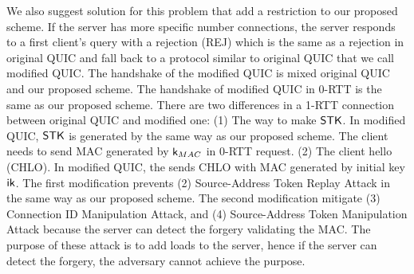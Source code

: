 We also suggest solution for this problem that add a restriction to our
proposed scheme.
If the server has more specific number connections, the server
responds to a first client's query with a rejection (REJ) which
is the same as a rejection in original QUIC and
fall back to a protocol similar to original QUIC that we call
modified QUIC.
The handshake of the modified QUIC is mixed original QUIC and our
proposed scheme.
The handshake of modified QUIC in 0-RTT is the same as our proposed
scheme.
There are two differences in a 1-RTT connection between original QUIC and modified one:
(1) The way to make $\mathsf{STK}$. In modified QUIC, $\mathsf{STK}$ is generated
by the same way as our proposed scheme. The client needs to send
MAC generated by $\mathsf{k}_{MAC}$ in 0-RTT request.
(2) The client hello (CHLO). In modified QUIC, the sends CHLO
with MAC generated by initial key $\mathsf{ik}$.
The first modification prevents (2) Source-Address Token Replay Attack
in the same way as our proposed scheme.
The second modification mitigate (3) Connection ID Manipulation Attack, and
(4) Source-Address Token Manipulation Attack because the server
can detect the forgery validating the MAC.
The purpose of these attack is to add loads to the server, hence
if the server can detect the forgery, the adversary cannot achieve
the purpose.